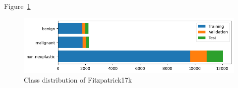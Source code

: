 Figure~\ref{fig:class_distribution_of_fitzpatrick17k}

\begin{figure}[H]
    \begin{center}
    \includegraphics[width=15cm]{../images/class_distribution_of_fitzpatrick17k.png}
    \caption{Class distribution of Fitzpatrick17k}\label{fig:class_distribution_of_fitzpatrick17k}
    \end{center}
\end{figure}
